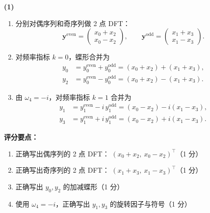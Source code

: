 \documentclass[10pt,a4paper]{exam-zh}
\newcommand{\bvec}[1]{\boldsymbol{#1}}
\newenvironment{grading}
  {\par\smallskip\Needspace{5\baselineskip}\small
   \noindent\textcolor{gradingred}{\textbf{评分要点：}}
   \begin{enumerate}[label=\textcolor{gradingred}{\arabic*.},
     leftmargin=2.4em,itemsep=0pt,topsep=2pt,parsep=0pt]}
  {\end{enumerate}\smallskip}
\newcommand{\gradeitem}[2]{\item #1（\textcolor{gradingred}{#2 分}）}
\newenvironment{answersteps}
  {\begin{enumerate}[label=\textbf{步骤 \arabic*.},
    leftmargin=4.8em,labelsep=0.6em,itemsep=2pt,topsep=3pt,parsep=0pt]}
  {\end{enumerate}}
\newcommand{\subanswer}[1]{%
  \par\medskip\Needspace{6\baselineskip}\noindent\textbf{#1}\par}
\begin{document}
\begin{solution}
\subanswer{(1)}
\begin{answersteps}
  \item 分别对偶序列和奇序列做 2 点 DFT：
  \[
  \bvec y^{\mathrm{even}}
  =
  \begin{pmatrix}x_0+x_2\\x_0-x_2\end{pmatrix},
  \qquad
  \bvec y^{\mathrm{odd}}
  =
  \begin{pmatrix}x_1+x_3\\x_1-x_3\end{pmatrix}.
  \]
  \item 对频率指标 $k=0$，蝶形合并为
  \[
  \begin{aligned}
  y_0&=y_0^{\mathrm{even}}+y_0^{\mathrm{odd}}
      =(x_0+x_2)+(x_1+x_3),\\
  y_2&=y_0^{\mathrm{even}}-y_0^{\mathrm{odd}}
      =(x_0+x_2)-(x_1+x_3).
  \end{aligned}
  \]
  \item 由 $\omega_4=-i$，对频率指标 $k=1$ 合并为
  \[
  \begin{aligned}
  y_1&=y_1^{\mathrm{even}}-i\,y_1^{\mathrm{odd}}
      =(x_0-x_2)-i(x_1-x_3),\\
  y_3&=y_1^{\mathrm{even}}+i\,y_1^{\mathrm{odd}}
      =(x_0-x_2)+i(x_1-x_3).
  \end{aligned}
  \]
\end{answersteps}
\begin{grading}
  \gradeitem{正确写出偶序列的 2 点 DFT：
  $(x_0+x_2,\ x_0-x_2)^\top$}{1}
  \gradeitem{正确写出奇序列的 2 点 DFT：
  $(x_1+x_3,\ x_1-x_3)^\top$}{1}
  \gradeitem{正确写出 $y_0,y_2$ 的加减蝶形}{1}
  \gradeitem{使用 $\omega_4=-i$，正确写出 $y_1,y_3$ 的旋转因子与符号}{1}
\end{grading}


\end{solution}
\end{document}

